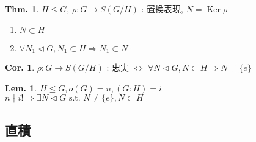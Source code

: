 \documentclass[uplatex,dvipdfmx,9pt]{beamer}
\newcommand{\nsubgroup}{\vartriangleleft} %
\newcommand{\st}{\text{ s.t. }}
\newcommand{\Ker}{\operatorname{Ker}}
\newcounter{textThmCount}
\newcounter{textLemCount}
\newcounter{textExmCount}
\theoremstyle{definition} %
\newtheorem{thmText}[textThmCount]{Thm.}
\newtheorem{corText}{Cor.}[textThmCount] %
\newtheorem{lemText}[textLemCount]{Lem.} %
\theoremstyle{example}
\begin{document}
      \begin{frame}
        
        \begin{thmText}
          $H \le G$, $\rho \colon G \to S(G/H)$ : 置換表現, $N = \Ker \rho$ \\
          \begin{enumerate}
            \item $N \subset H$
            \item $\forall N_1 \nsubgroup G, N_1 \subset H \Rightarrow N_1 \subset N$
          \end{enumerate}
        \end{thmText}

        \begin{corText}
          $\rho \colon G \to S(G/H)$ : 忠実 $\Leftrightarrow$ $\forall N \nsubgroup G, N \subset H \Rightarrow N = \{e\}$
        \end{corText}

        \begin{lemText}
          $H \le G, o(G) = n, (G:H) = i$ \\
          $n \nmid i! \Rightarrow \exists N \nsubgroup G \st N \ne \{e\}, N \subset H$
        \end{lemText}

      \end{frame}

    \subsection{\textsection \thesubsection 直積}
    \setcounter{textExmCount}{0}
\end{document}
